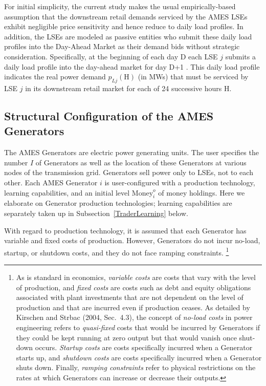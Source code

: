 \documentclass[12pt]{article}
\begin{document}
For initial simplicity, the current study makes the usual empirically-based assumption that the downstream 
retail demands serviced by the AMES LSEs exhibit negligible price sensitivity and hence reduce to daily load profiles. 
In addition, the LSEs are modeled as
passive entities who submit these  
daily load profiles into the Day-Ahead Market as their demand bids without strategic consideration.
Specifically, at the beginning of each day D each LSE $j$ submits a daily load profile 
into the day-ahead market for day D+1 .  This daily load profile 
indicates the real power demand $p_{Lj}(\mbox{H})$ (in MWs) that must be serviced by LSE $j$ in its downstream 
retail market for each of 24 successive hours H.  


\subsection{Structural Configuration of the AMES Generators \label{GenConfig} }

\medskip
\noindent
The AMES Generators are electric power generating units. 
The user specifies the number $I$ of
Generators as well as the location of these Generators at various nodes of
the transmission grid.  Generators sell power only to LSEs, not to each
other.  Each AMES Generator $i$ is user-configured with a 
production technology, learning capabilities, and an initial 
level $\mbox{Money}^o_{i}$ of money holdings.  Here we elaborate on Generator 
production technologies; learning capabilities are separately taken up in 
Subsection~\ref{TraderLearning} below.

With regard to production technology, it is assumed 
that each Generator has variable 
and fixed costs of production.  However, Generators do not incur no-load, startup, or shutdown costs, and 
they do not face ramping constraints.%
         \footnote{As is standard in economics, {\it variable costs\/} are
costs that vary with the level of production, and {\it fixed costs\/} are
costs such as debt and equity obligations associated with plant investments
that are not dependent on the level of production and that are incurred 
even if production ceases.  As detailed by Kirschen and Strbac (2004, Sec.~4.3), 
the concept of {\it no-load costs\/} 
in power engineering refers to \textit{quasi-fixed\/} costs that would be incurred by Generators 
if they could be kept running at zero output but that would vanish once
shut-down occurs.  {\it Startup costs\/} are costs specifically incurred 
when a Generator starts up, and \textit{shutdown costs\/} are costs specifically incurred when 
a Generator shuts down.  Finally, \textit{ramping constraints\/} refer to physical
restrictions on the rates at which Generators can increase or decrease their
outputs.}
\end{document}
